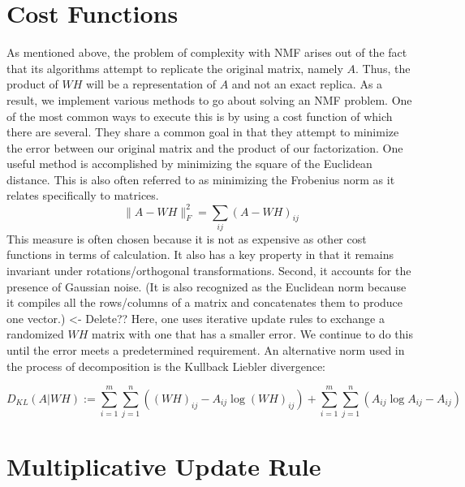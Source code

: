 \documentclass[
10pt, %
a4paper, %
oneside, %
headinclude,footinclude, %
BCOR5mm, %
]{scrartcl}
\begin{document}
\section{Cost Functions}
As mentioned above, the problem of complexity with NMF arises out of the fact that its algorithms attempt to replicate the original matrix, namely $A$.
Thus, the product of $WH$ will be a representation of $A$ and not an exact replica.
As a result, we implement various methods to go about solving an NMF problem.
One of the most common ways to execute this is by using a cost function of which there are several.
They share a common goal in that they attempt to minimize the error between our original matrix and the product of our factorization.
One useful method is accomplished by minimizing the square of the Euclidean distance.
This is also often referred to as minimizing the Frobenius norm as it relates specifically to matrices.
$$\lVert A-WH\rVert^{2}_{F}=\sum_{ij}(A-WH)_{ij}$$
This measure is often chosen because it is not as expensive as other cost functions in terms of calculation.
It also has a key property in that it remains invariant under rotations/orthogonal transformations.
Second, it accounts for the presence of Gaussian noise.
(It is also recognized as the Euclidean norm because it compiles all the rows/columns of a matrix and concatenates them to produce one vector.) <- Delete??
Here, one uses iterative update rules to exchange a randomized $WH$ matrix with one that has a smaller error.
We continue to do this until the error meets a predetermined requirement.
An alternative norm used in the process of decomposition is the Kullback Liebler divergence:

$$D_{KL}(A\vert WH):=\sum_{i=1}^{m}\sum_{j=1}^{n}((WH)_{ij}-A_{ij}\log(WH)_{ij})+\sum_{i=1}^{m}\sum_{j=1}^{n}(A_{ij}\log A_{ij}-A_{ij})$$


\section{Multiplicative Update Rule}

%
\end{document}
